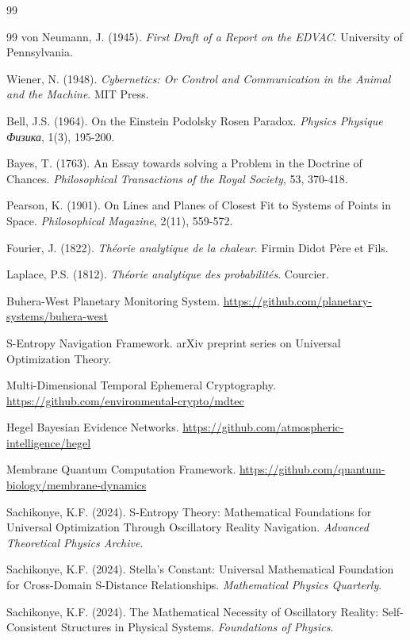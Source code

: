 \documentclass[12pt,a4paper]{article}
\begin{document}
\begin{thebibliography}{99}
\begin{thebibliography}{99}
von Neumann, J. (1945). \textit{First Draft of a Report on the EDVAC}. University of Pennsylvania.

Wiener, N. (1948). \textit{Cybernetics: Or Control and Communication in the Animal and the Machine}. MIT Press.

Bell, J.S. (1964). On the Einstein Podolsky Rosen Paradox. \textit{Physics Physique Физика}, 1(3), 195-200.

Bayes, T. (1763). An Essay towards solving a Problem in the Doctrine of Chances. \textit{Philosophical Transactions of the Royal Society}, 53, 370-418.

Pearson, K. (1901). On Lines and Planes of Closest Fit to Systems of Points in Space. \textit{Philosophical Magazine}, 2(11), 559-572.

Fourier, J. (1822). \textit{Théorie analytique de la chaleur}. Firmin Didot Père et Fils.

Laplace, P.S. (1812). \textit{Théorie analytique des probabilités}. Courcier.

Buhera-West Planetary Monitoring System. \url{https://github.com/planetary-systems/buhera-west}

S-Entropy Navigation Framework. arXiv preprint series on Universal Optimization Theory.

Multi-Dimensional Temporal Ephemeral Cryptography. \url{https://github.com/environmental-crypto/mdtec}

Hegel Bayesian Evidence Networks. \url{https://github.com/atmospheric-intelligence/hegel}

Membrane Quantum Computation Framework. \url{https://github.com/quantum-biology/membrane-dynamics}

Sachikonye, K.F. (2024). S-Entropy Theory: Mathematical Foundations for Universal Optimization Through Oscillatory Reality Navigation. \textit{Advanced Theoretical Physics Archive}.

Sachikonye, K.F. (2024). Stella's Constant: Universal Mathematical Foundation for Cross-Domain S-Distance Relationships. \textit{Mathematical Physics Quarterly}.

Sachikonye, K.F. (2024). The Mathematical Necessity of Oscillatory Reality: Self-Consistent Structures in Physical Systems. \textit{Foundations of Physics}.


\end{thebibliography}
\end{thebibliography}
\end{document}
